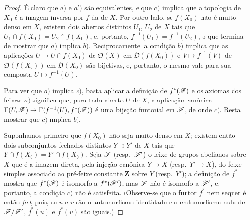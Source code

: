 \begin{proof}
É claro que $a)$ e $a')$ são equivalentes, e que $a)$ implica que a topologia de $X_0$ é a imagem inversa por $f$ da de $X$.
Por outro lado, se $f(X_0)$ não é muito denso em $X$, existem dois abertos distintos $U_1$, $U_2$ de $X$ tais que $U_1\cap f(X_0)=U_2\cap f(X_0)$, e, portanto, $f^{-1}(U_1)=f^{-1}(U_2)$, o que termina de mostrar que $a)$ implica $b)$.
Reciprocamente, a condição $b)$ implica que as aplicações $U\mapsto U\cap f(X_0)$ de $\mathfrak{O}(X)$ em $\mathfrak{O}(f(X_0))$ e $V\mapsto f^{-1}(V)$ de $\mathfrak{O}(f(X_0))$ em $\mathfrak{O}(X_0)$ são bijetivas, e, portanto, o mesmo vale para sua composta $U\mapsto f^{-1}(U)$.

Para ver que $a)$ implica $c)$, basta aplicar a definição de $f^*(\mathscr{F})$  e os axiomas dos feixes: $a)$ significa que, para todo aberto $U$ de $X$, a aplicação canônica $\Gamma(U,\sh{F})\to\Gamma(f^{-1}(U),f^*(\sh{F}))$ é uma bijeção funtorial em $\mathscr{F}$, de onde $c)$.
Resta mostrar que $c)$ implica $b)$.

Suponhamos primeiro que $f(X_0)$ não seja muito denso em $X$; existem então dois subconjuntos fechados distintos $Y\supset Y'$ de $X$ tais que $Y\cap f(X_0)=Y'\cap f(X_0)$.
Seja $\mathscr{F}$ (resp.\ $\mathscr{F}'$) o feixe de grupos abelianos sobre $X$ que é a imagem direta, pela injeção canônica $Y\to X$ (resp.\ $Y'\to X$), do feixe simples associado ao pré-feixe constante $\mathbf{Z}$ sobre $Y$ (resp.\ $Y'$); a definição de $f^*$  mostra que $f^*(\mathscr{F})$ é isomorfo a $f^*(\mathscr{F}')$, mas $\mathscr{F}$ não é isomorfo a $\mathscr{F}'$, e, portanto, a condição $c)$ não é satisfeita.
(Observe-se que o funtor $f^*$ nem sequer é então \emph{fiel}, pois, se $u$ e $v$ são o automorfismo identidade e o endomorfismo nulo de $\mathscr{F}/\mathscr{F}'$, $f^*(u)$ e $f^*(v)$ são iguais.)


\end{proof}
